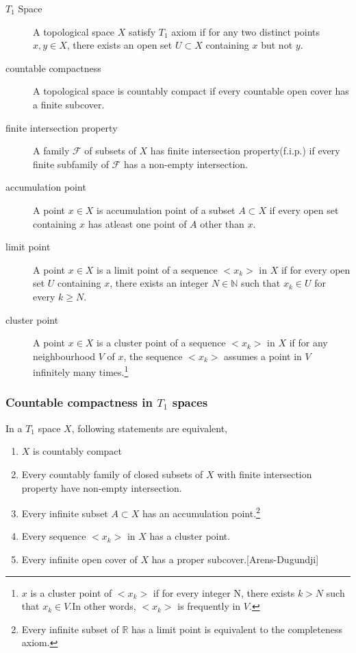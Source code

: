 \begin{description}
	\item[$T_1$ Space] A topological space $X$ satisfy $T_1$ axiom if for any two distinct points $x,y \in X$, there exists an open set $U \subset X$ containing $x$ but not $y$.\cite[7.1.2]{joshi}
	\item[countable compactness] A topological space is countably compact if every countable open cover has a finite subcover.\cite[11.1.1]{joshi}
	\item[finite intersection property] A family $\mathcal{F}$ of subsets of $X$ has finite intersection property(f.i.p.) if every finite subfamily of $\mathcal{F}$ has a non-empty intersection.\cite[10.2.6]{joshi}
	\item[accumulation point] A point $x \in X$ is accumulation point of a subset $A \subset X$ if every open set containing $x$ has atleast one point of $A$ other than $x$.\cite[5.2.7]{joshi}
	\item[limit point] A point $x \in X$ is a limit point of a sequence $< x_k >$ in $X$ if for every open set $U$ containing $x$, there exists an integer $N \in \mathbb{N}$ such that $x_k \in U$ for every $k \ge N$.\cite[4.1.7]{joshi}
	\item[cluster point] A point $x \in X$ is a cluster point of a sequence $< x_k >$ in $X$ if for any neighbourhood $V$ of $x$, the sequence $< x_k >$ assumes a point in $V$ infinitely many times.\footnote{$x$ is a cluster point of $< x_k >$ if for every integer N, there exists $k > N$ such that $x_k \in V$.In other words, $< x_k >$ is frequently in $V$.\cite[10.1.9]{joshi}}
\end{description}

\subsubsection{Countable compactness in $T_1$ spaces}
\begin{theorem}
	In a $T_1$ space $X$, following statements are equivalent,
\begin{enumerate}
	\item $X$ is countably compact
	\item Every countably family of closed subsets of $X$ with finite intersection property have non-empty intersection.
	\item Every infinite subset $A \subset X$ has an accumulation point.\footnote{Every infinite subset of $\mathbb{R}$ has a limit point is equivalent to the completeness axiom.}
	\item Every sequence $< x_k >$ in $X$ has a cluster point.
	\item Every infinite open cover of $X$ has a proper subcover.[Arens-Dugundji]
\end{enumerate}
\end{theorem}

